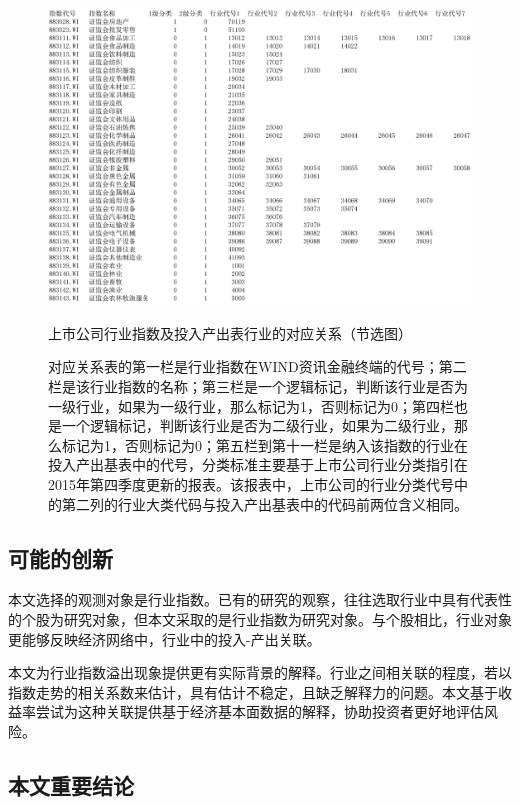 \documentclass{sysuthesis}
\begin{document}
  \begin{figure}[htbp]
  \centering
  \includegraphics[scale=0.65]{image/行业与指数对应关系.png}
  \caption{上市公司行业指数及投入产出表行业的对应关系（节选图）}
  \caption*{\footnotesize 对应关系表的第一栏是行业指数在WIND资讯金融终端的代号；第二栏是该行业指数的名称；第三栏是一个逻辑标记，判断该行业是否为一级行业，如果为一级行业，那么标记为1，否则标记为0；第四栏也是一个逻辑标记，判断该行业是否为二级行业，如果为二级行业，那么标记为1，否则标记为0；第五栏到第十一栏是纳入该指数的行业在投入产出基表中的代号，分类标准主要基于上市公司行业分类指引在2015年第四季度更新的报表\cite{_20154._SEC_Categorize}。该报表中，上市公司的行业分类代号中的第二列的行业大类代码与投入产出基表中的代码前两位含义相同。}
  \label{fig:iomapping}
  \end{figure}

\subsection{可能的创新}

本文选择的观测对象是行业指数。已有的研究的观察，往往选取行业中具有代表性的个股为研究对象，但本文采取的是行业指数为研究对象。与个股相比，行业对象更能够反映经济网络中，行业中的投入-产出关联。

本文为行业指数溢出现象提供更有实际背景的解释。行业之间相关联的程度，若以指数走势的相关系数来估计，具有估计不稳定，且缺乏解释力的问题。本文基于收益率尝试为这种关联提供基于经济基本面数据的解释，协助投资者更好地评估风险。

\subsection{本文重要结论}
\end{document}
